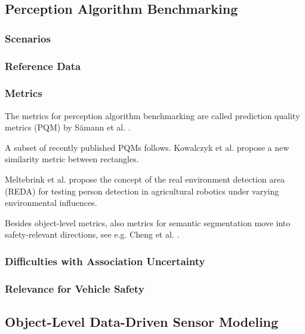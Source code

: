 \documentclass[conference]{IEEEtran}
\begin{document}
\subsection{Perception Algorithm Benchmarking}
\label{sec:developer_testing}

\subsubsection{Scenarios}
\label{sec:percBenchmarkingScenarios}
\subsubsection{Reference Data}
\subsubsection{Metrics}
\label{sec:perc_algo_benchm_metrics}

The metrics for perception algorithm benchmarking are called prediction quality metrics (PQM) by Sämann et al. \cite{Saemann2020strategy}.

A subset of recently published PQMs follows. 
Kowalczyk et al. \cite{Kowalczyk2022rectangle} propose a new similarity metric between rectangles. 

Meltebrink et al. \cite{Meltebrink2022reda} propose the concept of the real environment detection area (REDA) for testing person detection in agricultural robotics under varying environmental influences.

Besides object-level metrics, also metrics for semantic segmentation move into safety-relevant directions, see e.g. Cheng et al. \cite{Cheng2021safetymetrics}.

\subsubsection{Difficulties with Association Uncertainty}
\label{sec:association_uncertainty}



\subsubsection{Relevance for Vehicle Safety}
\label{sec:safety_relevance_dev_metrics}


\subsection{Object-Level Data-Driven Sensor Modeling}
\label{sec:sensor_modeling}
\end{document}
